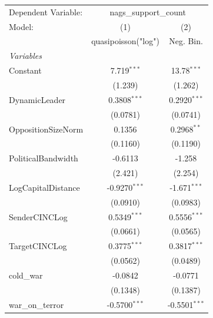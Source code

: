 
\begingroup
\centering
\begin{tabular}{lcc}
   \tabularnewline \midrule \midrule
   Dependent Variable: & \multicolumn{2}{c}{nags\_support\_count}\\
   Model:                                     & (1)                  & (2)\\  
                                              &  quasipoisson("log") & Neg. Bin.\\  
   \midrule
   \emph{Variables}\\
   Constant                                   & 7.719$^{***}$        & 13.78$^{***}$\\   
                                              & (1.239)              & (1.262)\\   
   DynamicLeader                              & 0.3808$^{***}$       & 0.2920$^{***}$\\   
                                              & (0.0781)             & (0.0741)\\   
   OppositionSizeNorm                         & 0.1356               & 0.2968$^{**}$\\   
                                              & (0.1160)             & (0.1190)\\   
   PoliticalBandwidth                         & -0.6113              & -1.258\\   
                                              & (2.421)              & (2.254)\\   
   LogCapitalDistance                         & -0.9270$^{***}$      & -1.671$^{***}$\\   
                                              & (0.0910)             & (0.0983)\\   
   SenderCINCLog                              & 0.5349$^{***}$       & 0.5556$^{***}$\\   
                                              & (0.0661)             & (0.0565)\\   
   TargetCINCLog                              & 0.3775$^{***}$       & 0.3817$^{***}$\\   
                                              & (0.0562)             & (0.0489)\\   
   cold\_war                                  & -0.0842              & -0.0771\\   
                                              & (0.1348)             & (0.1387)\\   
   war\_on\_terror                            & -0.5700$^{***}$      & -0.5501$^{***}$\\   

\end{tabular}
